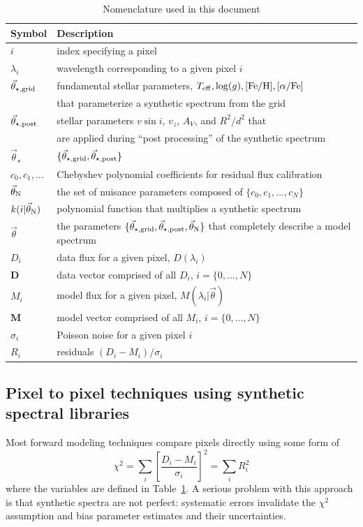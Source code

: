 \documentclass[preprint]{aastex} %
\newcommand{\vt}{\vec{\theta}}
\newcommand{\vg}{\vt_{\star, {\rm grid}}}
\newcommand{\vpp}{\vt_{\star, {\rm post}}}
\newcommand{\vstar}{\vt_{\star}}
\newcommand{\vN}{\vt_{\rm N}}
\newcommand{\fM}{ {\bm M}}
\newcommand{\fMi}{M_i}
\newcommand{\fD}{ {\bm D}}
\newcommand{\fDi}{D_i}
\newcommand{\Z}{[{\rm Fe}/{\rm H}]}
\newcommand{\A}{[\alpha/{\rm Fe}]}
\begin{document}
\begin{table}[!htb]
\begin{tabular}{ll}
\hline
\hline
Symbol & Description\\
\hline
\hline
$i$ & index specifying a pixel\\
$\lambda_i$ & wavelength corresponding to a given pixel $i$\\
$\vg$ & fundamental stellar parameters, $T_{\rm eff}, \log(g), \Z, \A$\\
  & that parameterize a synthetic spectrum from the grid\\
$\vpp$ & stellar parameters $v \sin i$, $v_z$, $A_V$, and $R^2/d^2$ that\\
  & are applied during ``post processing'' of the synthetic spectrum\\
$\vstar$ & $\{\vg,\vpp \}$\\
$c_0, c_1, \ldots$ & Chebyshev polynomial coefficients for residual flux calibration\\
$\vN$ & the set of nuisance parameters composed of $\{c_0, c_1, \ldots, c_N\}$\\
$k(i | \vN)$  & polynomial function that multiplies a synthetic spectrum\\
$\vt$ & the parameters $\{\vg, \vpp, \vN\}$ that completely describe a model spectrum\\
$\fDi$ & data flux for a given pixel, $D(\lambda_i)$\\
$\fD$ & data vector comprised of all $\fDi$, $i = \{0, \ldots, N\}$\\
$\fMi$ & model flux for a given pixel, $M(\lambda_i | \vt)$\\
$\fM$ & model vector comprised of all $\fMi$, $i = \{0, \ldots, N\}$\\
$\sigma_i$ & Poisson noise for a given pixel $i$\\
$R_i$ & residuals $(\fDi - \fMi)/\sigma_i$\\
\hline
\end{tabular}
\caption{Nomenclature used in this document}
\label{tab:nomenclature}
\end{table}

\subsection{Pixel to pixel techniques using synthetic spectral libraries}
\label{sec:pix}
Most forward modeling techniques compare pixels directly using some form of
\begin{equation}
  \chi^2 = \sum_i \left [\frac{ \fDi - \fMi}{\sigma_i} \right ]^2 = \sum_i R_i^2
\end{equation}
where the variables are defined in Table~\ref{tab:nomenclature}. A serious problem with this approach is that synthetic spectra are not perfect: systematic errors invalidate the $\chi^2$ assumption and bias parameter estimates and their uncertainties.
\end{document}
